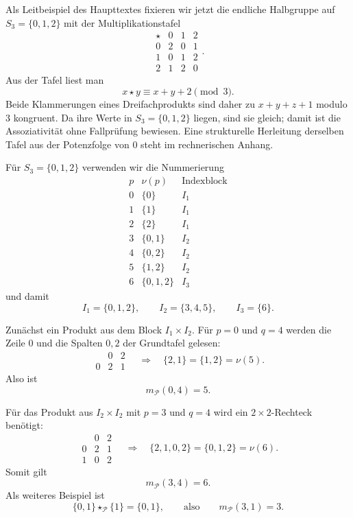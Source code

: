 \documentclass[main.tex]{subfiles}
\begin{document}
Als Leitbeispiel des Haupttextes fixieren wir jetzt die endliche Halbgruppe
auf \(S_3=\{0,1,2\}\) mit der Multiplikationstafel
\[
\begin{array}{c|ccc}
\star&0&1&2\\\hline
0&2&0&1\\
1&0&1&2\\
2&1&2&0
\end{array}.
\]
Aus der Tafel liest man
\[
  x\star y\equiv x+y+2\pmod 3.
\]
Beide Klammerungen eines Dreifachprodukts sind daher zu
\(x+y+z+1\) modulo \(3\) kongruent.  Da ihre Werte in
\(S_3=\{0,1,2\}\) liegen, sind sie gleich; damit ist die Assoziativität ohne
Fallprüfung bewiesen.  Eine strukturelle Herleitung derselben Tafel aus der
Potenzfolge von \(0\) steht im rechnerischen Anhang.

Für \(S_3=\{0,1,2\}\) verwenden wir die Nummerierung
\[
\begin{array}{c|c|c}
p&\nu(p)&\text{Indexblock}\\\hline
0&\{0\}&I_1\\
1&\{1\}&I_1\\
2&\{2\}&I_1\\\hline
3&\{0,1\}&I_2\\
4&\{0,2\}&I_2\\
5&\{1,2\}&I_2\\\hline
6&\{0,1,2\}&I_3
\end{array}
\]
und damit
\[
  I_1=\{0,1,2\},
  \qquad
  I_2=\{3,4,5\},
  \qquad
  I_3=\{6\}.
\]

Zunächst ein Produkt aus dem Block \(I_1\times I_2\).  Für \(p=0\) und
\(q=4\) werden die Zeile \(0\) und die Spalten \(0,2\) der Grundtafel
gelesen:
\[
\begin{array}{c|cc}
&0&2\\\hline
0&2&1
\end{array}
\quad\Longrightarrow\quad
\{2,1\}=\{1,2\}=\nu(5).
\]
Also ist
\[
  m_{\mathcal P}(0,4)=5.
\]

Für das Produkt aus \(I_2\times I_2\) mit \(p=3\) und \(q=4\) wird ein
\(2\times2\)-Rechteck benötigt:
\[
\begin{array}{c|cc}
&0&2\\\hline
0&2&1\\
1&0&2
\end{array}
\quad\Longrightarrow\quad
\{2,1,0,2\}=\{0,1,2\}=\nu(6).
\]
Somit gilt
\[
  m_{\mathcal P}(3,4)=6.
\]
Als weiteres Beispiel ist
\[
  \{0,1\}\star_{\mathcal P}\{1\}=\{0,1\},
  \qquad\text{also}\qquad
  m_{\mathcal P}(3,1)=3.
\]
\end{document}
